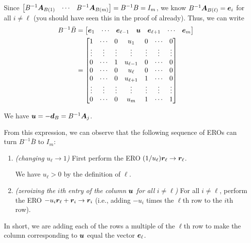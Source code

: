 \begin{enumerate}
Since \(\begin{bmatrix}B^{-1}\bm{A}_{B(1)}&\cdots&B^{-1}\bm{A}_{B(m)}\end{bmatrix}
=B^{-1}B=I_m\), we know \(B^{-1}\bm{A}_{B(\ell)}=\bm{e}_i\) for all
\(i\ne\ell\) (you should have seen this in the proof of
 already). Thus, we can write
\begin{align*}
B^{-1}\bar{B}&=\begin{bmatrix}\bm{e}_1&\cdots&\bm{e}_{\ell-1}&\bm{u}&
\bm{e}_{\ell+1}&\cdots&\bm{e}_m\end{bmatrix} \\
&=\begin{bmatrix}1&\cdots&0&u_1&0&\cdots&0 \\
\vdots&\vdots&\vdots&\vdots&\vdots&\vdots&\vdots \\
0&\cdots&1&u_{\ell-1}&0&\cdots&0 \\
0&\cdots&0&u_{\ell}&0&\cdots&0 \\
0&\cdots&0&u_{\ell+1}&1&\cdots&0 \\
\vdots&\vdots&\vdots&\vdots&\vdots&\vdots&\vdots \\
0&\cdots&0&u_{m}&1&\cdots&1
\end{bmatrix}
\end{align*}
\begin{note}
We have \(\bm{u}=-\bm{d}_{B}=B^{-1}\bm{A}_j\).
\end{note}
From this expression, we can observe that the following sequence of EROs can
turn \(B^{-1}\bar{B}\) to \(I_m\):
\begin{enumerate}[label={(\arabic*)}]
\item \emph{(changing \(u_{\ell}\to 1\))} First perform the ERO
\((1/u_{\ell})\bm{r}_{\ell}\to\bm{r}_{\ell}\).
\begin{note}
We have \(u_{\ell}>0\) by the definition of \(\ell\).
\end{note}
\item \emph{(zeroizing the \(i\)th entry of the column \(\bm{u}\) for all \(i\ne\ell\))}
For all \(i\ne\ell\), perform the ERO
\(-u_i\bm{r}_{\ell}+\bm{r}_{i}\to\bm{r}_{i}\) (i.e., adding
\(-u_i\) times the \(\ell\)th row to the \(i\)th row).
\end{enumerate}
In short, we are adding each of the rows a multiple of the \(\ell\)th row to
make the column corresponding to \(\bm{u}\) equal the vector \(\bm{e}_{\ell}\).


\end{enumerate}
